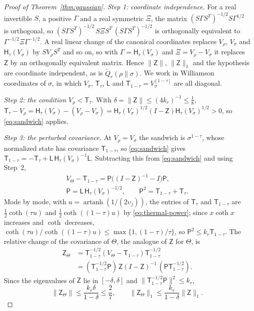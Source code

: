 \documentclass[aps,prl,reprint,longbibliography,raggedbottom]{revtex4-2}
\newcommand{\norm}[1]{\lVert #1\rVert}
\DeclareMathOperator{\artanh}{artanh}
\newcommand{\Therm}{\mathsf H}
\newcommand{\Qtil}{\widetilde Q}
\begin{document}
\begin{proof}[Proof of Theorem~\ref{thm:gaussian}]
\emph{Step 1: coordinate independence.} For a real invertible $S$, a
positive $\Gamma$ and a real symmetric $\Xi$, the matrix
$(S\Gamma S^T)^{-1/2}S\Gamma^{1/2}$ is orthogonal, so
$(S\Gamma S^T)^{-1/2}\,S\Xi S^T\,(S\Gamma S^T)^{-1/2}$ is orthogonally
equivalent to $\Gamma^{-1/2}\Xi\Gamma^{-1/2}$. A real linear change of
the canonical coordinates replaces $V_\rho$, $V_\sigma$ and
$\Therm_\tau(V_\sigma)$ by $SV_\rho S^T$ and so on, so with
$\Gamma=\Therm_\tau(V_\sigma)$ and $\Xi=V_\rho-V_\sigma$ it replaces
$\mathsf Z$ by an orthogonally equivalent matrix. Hence $\norm{\mathsf Z}$,
$\norm{\mathsf Z}_1$ and the hypothesis are coordinate independent, as
is $\Qtil_r(\rho\|\sigma)$. We work in Williamson coordinates of
$\sigma$, in which $V_\sigma$, $\mathsf T_\tau$,
$\mathsf L$ and $\mathsf T_{1-\tau}=V_\sigma^{[1-\tau]}$ are all
diagonal.

\emph{Step 2: the condition $V_\rho<\mathsf T_\tau$.} With
$\delta=\norm{\mathsf Z}\le(4k_r)^{-1}\le\frac18$,
$\mathsf T_\tau-V_\rho=\Therm_\tau(V_\sigma)-(V_\rho-V_\sigma)
=\Therm_\tau(V_\sigma)^{1/2}(I-\mathsf Z)\Therm_\tau(V_\sigma)^{1/2}>0$, so \eqref{eq:sandwich}
applies.

\emph{Step 3: the perturbed covariance.} At $V_\rho=V_\sigma$ the
sandwich is $\sigma^{1-\tau}$, whose normalized state has covariance
$\mathsf T_{1-\tau}$, so \eqref{eq:sandwich} gives
$\mathsf T_{1-\tau}=-\mathsf T_\tau+\mathsf L\,\Therm_\tau(V_\sigma)^{-1}\mathsf L$.
Subtracting this from \eqref{eq:sandwich} and using Step~2,
\[
\begin{gathered}
V_\Theta-\mathsf T_{1-\tau}
=\mathsf P\bigl((I-\mathsf Z)^{-1}-I\bigr)\mathsf P,\\
\mathsf P=\mathsf L\,\Therm_\tau(V_\sigma)^{-1/2},\qquad
\mathsf P^2=\mathsf T_{1-\tau}+\mathsf T_\tau .
\end{gathered}
\]
Mode by mode, with $u=\artanh(1/(2\upsilon_j))$, the entries of
$\mathsf T_\tau$ and $\mathsf T_{1-\tau}$ are $\frac12\coth(\tau u)$
and $\frac12\coth((1-\tau)u)$ by \eqref{eq:thermal-power}; since
$x\coth x$ increases and $\coth$ decreases,
$\coth(\tau u)/\coth(({1-\tau})u)\le\max\{1,({1-\tau})/\tau\}$, so
$\mathsf P^2\le k_r\mathsf T_{1-\tau}$. The relative change of
the covariance of $\Theta$, the analogue of $\mathsf Z$ for $\Theta$,
is
\[
\begin{aligned}
\mathsf Z_\Theta&=\mathsf T_{1-\tau}^{-1/2}(V_\Theta-\mathsf T_{1-\tau})\mathsf T_{1-\tau}^{-1/2}\\
&=(\mathsf T_{1-\tau}^{-1/2}\mathsf P)\,\mathsf Z(I-\mathsf Z)^{-1}\,(\mathsf P\mathsf T_{1-\tau}^{-1/2}).
\end{aligned}
\]
Since the eigenvalues of $\mathsf Z$ lie in $[-\delta,\delta]$ and
$\norm{\mathsf T_{1-\tau}^{-1/2}\mathsf P}^2\le k_r$,
\begin{equation}
\norm{\mathsf Z_\Theta}\le\frac{k_r\delta}{1-\delta}\le\frac27,\qquad
\norm{\mathsf Z_\Theta}_1\le\frac{k_r}{1-\delta}\norm{\mathsf Z}_1 .
\label{eq:purity-perturbation}
\end{equation}


\end{proof}
\end{document}
